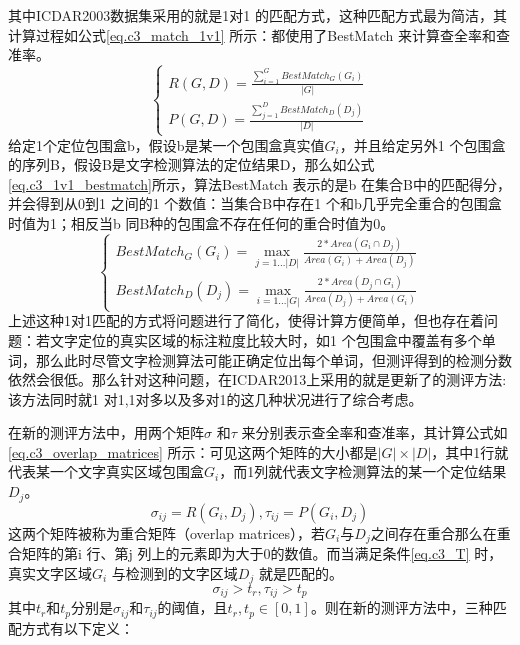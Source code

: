         其中ICDAR2003数据集采用的就是1对1 的匹配方式\cite{Mariano2002Performance}，这种匹配方式最为简洁，其计算过程如公式\ref{eq.c3_match_1v1} 所示：都使用了BestMatch 来计算查全率和查准率。
        \begin{equation}
        \left\{
        \begin{array}{c}
        R(G,D)=\frac{\sum_{i=1}^GBestMatch_G(G_i)}{|G|}\\
        P(G,D)=\frac{\sum_{j=1}^DBestMatch_D(D_j)}{|D|}
        \end{array}
        \right.
        \label{eq.c3_match_1v1}
        \end{equation}
        给定1个定位包围盒b，假设b是某一个包围盒真实值$G_i$，并且给定另外1 个包围盒的序列B，假设B是文字检测算法的定位结果D，那么如公式\ref{eq.c3_1v1_bestmatch}所示，算法BestMatch 表示的是b 在集合B中的匹配得分，并会得到从0到1 之间的1 个数值：当集合B中存在1 个和b几乎完全重合的包围盒时值为1；相反当b 同B种的包围盒不存在任何的重合时值为0。
        \begin{equation}
        \left\{
        \begin{array}{c}
        BestMatch_G(G_i)=\max_{j=1...|D|} \frac{2*Area(G_i \cap D_j)}{Area(G_i)+Area(D_j)}\\
        BestMatch_D(D_j)=\max_{i=1...|G|} \frac{2*Area(D_j \cap G_i)}{Area(D_j)+Area(G_i)}
        \end{array}
        \right.
        \label{eq.c3_1v1_bestmatch}
        \end{equation}
        上述这种1对1匹配的方式将问题进行了简化，使得计算方便简单，但也存在着问题：若文字定位的真实区域的标注粒度比较大时，如1 个包围盒中覆盖有多个单词，那么此时尽管文字检测算法可能正确定位出每个单词，但测评得到的检测分数依然会很低。那么针对这种问题，在ICDAR2013上采用的就是更新了的测评方法\cite{Wolf2006Object}:该方法同时就1 对1,1对多以及多对1的这几种状况进行了综合考虑。

        在新的测评方法中，用两个矩阵$\sigma$ 和$\tau$ 来分别表示查全率和查准率，其计算公式如\ref{eq.c3_overlap_matrices} 所示：可见这两个矩阵的大小都是$|G|\times|D|$，其中1行就代表某一个文字真实区域包围盒$G_i$，而1列就代表文字检测算法的某一个定位结果$D_j$。
        \begin{equation}
        \sigma_{ij}=R(G_i,D_j),\tau_{ij}=P(G_i,D_j)
        \label{eq.c3_overlap_matrices}
        \end{equation}
        这两个矩阵被称为重合矩阵（overlap matrices），若$G_i$与$D_j$之间存在重合那么在重合矩阵的第i 行、第j 列上的元素即为大于0的数值。而当满足条件\ref{eq.c3_T} 时，真实文字区域$G_i$ 与检测到的文字区域$D_j$ 就是匹配的。
        \begin{equation}
        \sigma_{ij}>t_r,\tau_{ij}>t_p
        \label{eq.c3_T}
        \end{equation}
        其中$t_r$和$t_p$分别是$\sigma_{ij}$和$\tau_{ij}$的阈值，且$t_r,t_p \in [0,1]$。则在新的测评方法中，三种匹配方式有以下定义：

